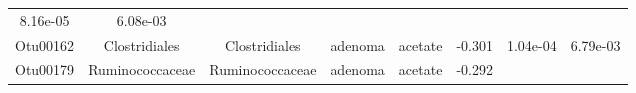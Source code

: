 \documentclass[11pt,]{article}
\begin{document}
\begin{longtable}[]{@{}cccccccc@{}}
\begin{minipage}[t]{0.08\columnwidth}
8.16e-05\strut
\end{minipage} & \begin{minipage}[t]{0.08\columnwidth}\centering\strut
6.08e-03\strut
\end{minipage}\tabularnewline
\begin{minipage}[t]{0.08\columnwidth}\centering\strut
Otu00162\strut
\end{minipage} & \begin{minipage}[t]{0.15\columnwidth}\centering\strut
Clostridiales\strut
\end{minipage} & \begin{minipage}[t]{0.15\columnwidth}\centering\strut
Clostridiales\strut
\end{minipage} & \begin{minipage}[t]{0.08\columnwidth}\centering\strut
adenoma\strut
\end{minipage} & \begin{minipage}[t]{0.09\columnwidth}\centering\strut
acetate\strut
\end{minipage} & \begin{minipage}[t]{0.07\columnwidth}\centering\strut
-0.301\strut
\end{minipage} & \begin{minipage}[t]{0.08\columnwidth}\centering\strut
1.04e-04\strut
\end{minipage} & \begin{minipage}[t]{0.08\columnwidth}\centering\strut
6.79e-03\strut
\end{minipage}\tabularnewline
\begin{minipage}[t]{0.08\columnwidth}\centering\strut
Otu00179\strut
\end{minipage} & \begin{minipage}[t]{0.15\columnwidth}\centering\strut
Ruminococcaceae\strut
\end{minipage} & \begin{minipage}[t]{0.15\columnwidth}\centering\strut
Ruminococcaceae\strut
\end{minipage} & \begin{minipage}[t]{0.08\columnwidth}\centering\strut
adenoma\strut
\end{minipage} & \begin{minipage}[t]{0.09\columnwidth}\centering\strut
acetate\strut
\end{minipage} & \begin{minipage}[t]{0.07\columnwidth}\centering\strut
-0.292\strut
\end{minipage} & \begin{minipage}[t]{0.08\columnwidth}\centering\strut

\end{minipage}
\end{longtable}
\end{document}

